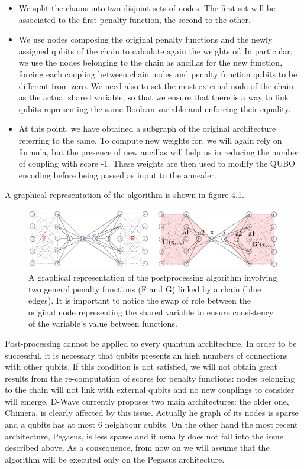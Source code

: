 \begin{itemize}
    \item We split the chains into two disjoint sets of nodes. The first set will be associated to the first penalty function, the second to the other.
    \item We use nodes composing the original penalty functions and the newly assigned qubits of the chain to calculate again the weights of. In particular, we use the nodes belonging to the chain as ancillas for the new function, forcing each coupling between chain nodes and penalty function qubits to be different from zero. We need also to set the most external node of the chain as the actual shared variable, so that we ensure that there is a way to link qubits representing the same Boolean variable and enforcing their equality.
    \item At this point, we have obtained a subgraph of the original architecture referring to the same. To compute new weights for, we will again rely on formula, but the presence of new ancillas will help us in reducing the number of coupling with score -1. These weights are then used to modify the QUBO encoding before being passed as input to the annealer.
\end{itemize}

A graphical representation of the algorithm is shown in figure 4.1.

\begin{figure}[t]
	\begin{center}
	\includegraphics[width=\textwidth]{images/PostAlg.png}
	\caption{A graphical representation of the postprocessing algorithm involving two general penalty functions (F and G) linked by a chain (blue edges). It is important to notice the swap of role between the original node representing the shared variable to ensure consistency of the variable's value between functions.}
	\end{center}
\end{figure}

Post-processing cannot be applied to every quantum architecture. In order to be successful, it is necessary that qubits presents an high numbers of connections with other qubits. If this condition is not satisfied, we will not obtain great results from the re-computation of scores for penalty functions: nodes belonging to the chain will not link with external qubits and no new couplings to consider will emerge. D-Wave currently proposes two main architectures: the older one, Chimera, is clearly affected by this issue. Actually he graph of its nodes is sparse and a qubits has at most 6 neighbour qubits. On the other hand the most recent architecture, Pegasus, is less sparse and it usually does not fall into the issue described above. As a consequence, from now on we will assume that the algorithm will be executed only on the Pegasus architecture.


